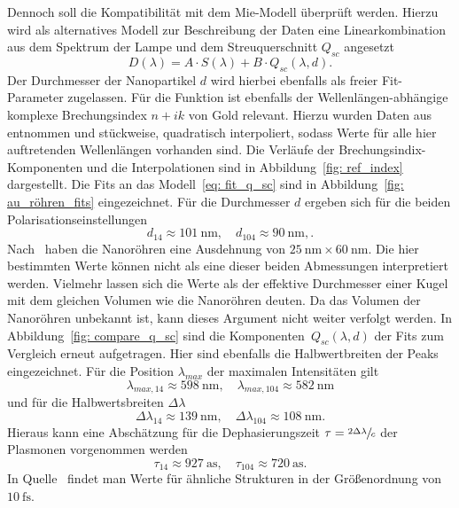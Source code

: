 Dennoch soll die Kompatibilität mit dem Mie-Modell überprüft werden. Hierzu wird als alternatives Modell zur Beschreibung der
Daten eine Linearkombination aus dem Spektrum der Lampe und dem Streuquerschnitt $Q_{sc}$ angesetzt
\begin{equation}
  D(\lambda) = A \cdot S(\lambda) + B \cdot Q_{sc}(\lambda, d).
  \label{eq: fit_q_sc}
\end{equation}
Der Durchmesser der Nanopartikel $d$ wird hierbei ebenfalls als freier Fit-Parameter zugelassen.
Für die Funktion ist ebenfalls der Wellenlängen-abhängige komplexe Brechungsindex $n + ik$ von Gold relevant. Hierzu wurden
Daten aus~\cite{ref_index_au} entnommen und stückweise, quadratisch interpoliert, sodass Werte für alle hier auftretenden Wellenlängen
vorhanden sind. Die Verläufe der Brechungsindix-Komponenten und die Interpolationen sind in Abbildung~\ref{fig: ref_index}
dargestellt. Die Fits an das Modell~\eqref{eq: fit_q_sc} sind in Abbildung~\ref{fig: au_röhren_fits} eingezeichnet.
Für die Durchmesser $d$ ergeben sich für die beiden Polarisationseinstellungen
\begin{equation}
  d_{14} \approx \SI{101}{\nano\meter}, \quad d_{104} \approx \SI{90}{\nano\meter}, .
\end{equation}
Nach~\cite{anleitung} haben die Nanoröhren eine Ausdehnung von $\SI{25}{\nano\meter} \times \SI{60}{\nano\meter}$. Die hier bestimmten Werte
können nicht als eine dieser beiden Abmessungen interpretiert werden. Vielmehr lassen sich die Werte als
der effektive Durchmesser einer Kugel mit dem gleichen Volumen wie die Nanoröhren deuten. Da das Volumen der Nanoröhren
unbekannt ist, kann dieses Argument nicht weiter verfolgt werden.
In Abbildung~\ref{fig: compare_q_sc} sind die Komponenten~$Q_{sc}(\lambda, d)$ der Fits zum Vergleich erneut aufgetragen. Hier sind ebenfalls
die Halbwertbreiten der Peaks eingezeichnet. Für die Position $\lambda_{max}$ der maximalen Intensitäten gilt
\begin{equation}
  \lambda_{max, 14} \approx \SI{598}{\nano\meter}, \quad \lambda_{max, 104} \approx \SI{582}{\nano\meter}
\end{equation}
und für die Halbwertsbreiten $\Delta \lambda$
\begin{equation}
  \Delta \lambda_{14} \approx \SI{139}{\nano\meter}, \quad \Delta \lambda_{104} \approx \SI{108}{\nano\meter}.
\end{equation}
Hieraus kann eine Abschätzung für die Dephasierungszeit $\tau = \sfrac{2 \Delta \lambda}{c}$ \cite{t_deph} der Plasmonen vorgenommen werden
\begin{equation}
  \tau_{14} \approx \SI{927}{\atto \second}, \quad   \tau_{104} \approx \SI{720}{\atto\second}.
\end{equation}
In Quelle~\cite{t_deph} findet man Werte für ähnliche Strukturen in der Größenordnung von $\SI{10}{\femto\second}$.

